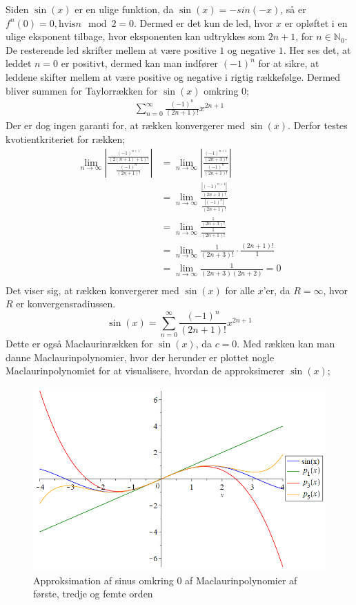 Siden $\sin(x)$ er en ulige funktion, da $\sin(x)=-sin(-x)$, så er $f^{n}(0)=0, \text{hvis} n \mod 2=0$. Dermed er det kun de led, hvor $x$ er opløftet i en ulige eksponent tilbage, hvor eksponenten kan udtrykkes som $2n+1$, for $n\in \mathbb{N}_0$. De resterende led skrifter mellem at være positive $1$ og negative $1$. Her ses det, at leddet $n=0$ er positivt, dermed kan man indfører $(-1)^n$ for at sikre, at leddene skifter mellem at være positive og negative i rigtig rækkefølge. Dermed bliver summen for Taylorrækken for $\sin(x)$ omkring $0$;
\begin{align*}
\sum_{n=0}^{\infty} \frac{(-1)^n}{(2n+1)!}x^{2n+1}
\end{align*}
Der er dog ingen garanti for, at rækken konvergerer med $\sin(x)$. Derfor testes kvotientkriteriet for rækken;
\begin{align*}
\lim\limits_{n \to \infty}
\left\lvert
\frac{\frac{(-1)^{n+1}}{(2(n+1)+1)!}}
{\frac{(-1)^n}{(2n+1)!}} 
\right\lvert
&=
\lim\limits_{n \to \infty}
\left\lvert
\frac{\frac{(-1)^{n+1}}{(2n+3)!}}
{\frac{(-1)^n}{(2n+1)!}}
\right\lvert 
\\
&=
\lim\limits_{n \to \infty}
\frac{\frac{\left\lvert (-1)^{n+1} \right\lvert }{(2n+3)!}}
{\frac{\left\lvert (-1)^n \right\lvert }{(2n+1)!}}
\\
&=
\lim\limits_{n \to \infty}
\frac{\frac{1}{(2n+3)!}}
{\frac{1}{(2n+1)!} }
\\
&=
\lim\limits_{n \to \infty}
\frac{1}{(2n+3)!}
\cdot
\frac{(2n+1)!}{1}
\\
&=
\lim\limits_{n \to \infty}
\frac{1}{(2n+3)(2n+2)}
=0 \\
\end{align*}
Det viser sig, at rækken konvergerer med $\sin(x)$ for alle $x$'er, da $R=\infty$, hvor $R$ er konvergensradiussen.
\begin{equation}\label{eq:sinrække}
\sin(x)=\sum_{n=0}^{\infty} \frac{(-1)^n}{(2n+1)!}x^{2n+1}
\end{equation}
Dette er også Maclaurinrækken for $\sin(x)$, da $c=0$. Med rækken kan man danne Maclaurinpolynomier, hvor der herunder er plottet nogle Maclaurinpolynomiet for at visualisere, hvordan de approksimerer $\sin(x)$;
\begin{figure}[H]
	\centering
	\includegraphics[scale=0.4]{fig/img/taylor_sin}
	\caption{Approksimation af sinus omkring 0 af Maclaurinpolynomier af første, tredje og femte orden}
 	\label{fig:taylor_sin}
\end{figure}
